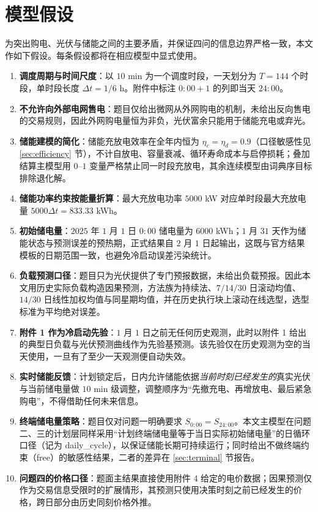 \section{模型假设}

为突出购电、光伏与储能之间的主要矛盾，并保证四问的信息边界严格一致，本文作如下假设。每条假设都将在相应模型中显式使用。

\begin{enumerate}[label=\arabic*., itemsep=2pt, topsep=3pt]
	\item \textbf{调度周期与时间尺度}：以 $10$ min 为一个调度时段，一天划分为 $T=144$ 个时段，单时段长度 $\Delta t=1/6$ h。附件中标注 $0{:}00{+}1$ 的列即当天 $24{:}00$。
	\item \textbf{不允许向外部电网售电}：题目仅给出微网从外网购电的机制，未给出反向售电的交易规则，因此外网购电量恒为非负，光伏富余只能用于储能充电或弃光。
	\item \textbf{储能建模的简化}：储能充放电效率在全年内恒为 $\eta_c=\eta_d=0.9$（口径敏感性见 \ref{sec:efficiency} 节），不计自放电、容量衰减、循环寿命成本与启停损耗；叠加结算主模型用 $0$--$1$ 变量严格禁止同一时段充放电，其余连续模型由词典序目标排除退化解。
	\item \textbf{储能功率约束按能量折算}：最大充放电功率 $5000$ kW 对应单时段最大充放电量 $5000\Delta t=833.33$ kWh。
	\item \textbf{初始储电量}：$2025$ 年 $1$ 月 $1$ 日 $0{:}00$ 储电量为 $6000$ kWh；$1$ 月 $31$ 天作为储能状态与预测误差的预热期，正式结果自 $2$ 月 $1$ 日起输出，这既与官方结果模板的日期范围一致，也避免冷启动误差污染统计。
	\item \textbf{负载预测口径}：题目只为光伏提供了专门预报数据，未给出负载预报。因此本文用历史实际负载构造因果预测，方法族为持续法、$7/14/30$ 日滚动均值、$14/30$ 日线性加权均值与同星期均值，并在历史执行块上滚动在线选型，选型标准为平均绝对误差。
	\item \textbf{附件 1 作为冷启动先验}：$1$ 月 $1$ 日之前无任何历史观测，此时以附件 1 给出的典型日负载与光伏预测曲线作为先验基预测。该先验仅在历史观测为空的当天使用，一旦有了至少一天观测便自动失效。
	\item \textbf{实时储能反馈}：计划锁定后，日内允许储能依据\emph{当前时刻已经发生的}真实光伏与当前储电量做 $10$ min 级调整，调整顺序为“先撤充电、再增放电、最后紧急购电”，不得借助任何未来信息。
	\item \textbf{终端储电量策略}：题目仅对问题一明确要求 $S_{0{:}00}=S_{24{:}00}$。本文主模型在问题二、三的计划层同样采用“计划终端储电量等于当日实际初始储电量”的日循环口径（记为 daily\_cycle），以保证储能长期可持续运行；同时给出不做终端约束（free）的敏感性结果，二者的差异在 \ref{sec:terminal} 节报告。
	\item \textbf{问题四的价格口径}：题面主结果直接使用附件 4 给定的电价数据；因果预测仅作为交易信息受限时的扩展情形，其预测只使用决策时刻之前已经发生的价格，跨日部分由历史同刻价格外推。
\end{enumerate}

